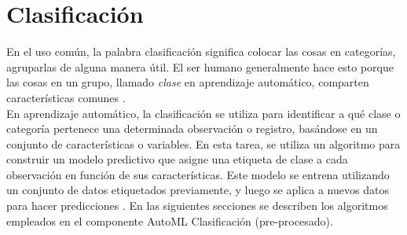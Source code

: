 \section{Clasificación}
En el uso común, la palabra clasificación significa colocar las cosas en categorías, agruparlas de alguna manera útil. El ser humano generalmente hace esto porque las cosas en un grupo, llamado \textit{clase} en aprendizaje automático, comparten características comunes \citep{sammut2011encyclopedia}. \\
En aprendizaje automático, la clasificación se utiliza para identificar a qué clase o categoría pertenece una determinada observación o registro, basándose en un conjunto de características o variables. En esta tarea, se utiliza un algoritmo para construir un modelo predictivo que asigne una etiqueta de clase a cada observación en función de sus características. Este modelo se entrena utilizando un conjunto de datos etiquetados previamente, y luego se aplica a nuevos datos para hacer predicciones \citep{sammut2011encyclopedia}. En las siguientes secciones se describen los algoritmos empleados en el componente AutoML Clasificación (pre-procesado).

